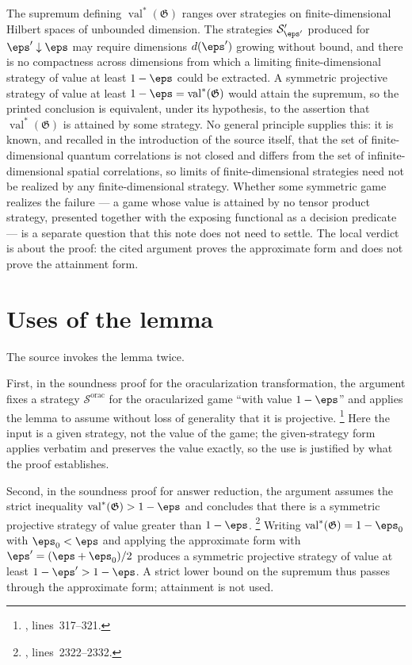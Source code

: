 \documentclass[11pt]{article}
\newcommand{\val}{\operatorname{val}}
\newcommand{\game}{\mathfrak{G}}
\newcommand{\strategy}{\mathcal{S}}
\begin{document}
The supremum defining $\val^*(\game)$ ranges over strategies on
finite-dimensional Hilbert spaces of unbounded dimension.  The strategies
$\strategy'_{\eps'}$ produced for $\eps' \downarrow \eps$ may require
dimensions $d(\eps')$ growing without bound, and there is no compactness
across dimensions from which a limiting finite-dimensional strategy of value
at least $1-\eps$ could be extracted.  A symmetric projective strategy of
value at least $1-\eps = \val^*(\game)$ would attain the supremum, so the
printed conclusion is equivalent, under its hypothesis, to the assertion that
$\val^*(\game)$ is attained by some strategy.  No general principle supplies
this: it is known, and recalled in the introduction of the source itself, that
the set of finite-dimensional quantum correlations is not closed and differs
from the set of infinite-dimensional spatial correlations, so limits of
finite-dimensional strategies need not be realized by any finite-dimensional
strategy.  Whether some symmetric game realizes the failure --- a game whose
value is attained by no tensor product strategy, presented together with the
exposing functional as a decision predicate --- is a separate question that
this note does not need to settle.  The local verdict is about the proof: the
cited argument proves the approximate form and does not prove the attainment
form.

\section{Uses of the lemma}

The source invokes the lemma twice.

First, in the soundness proof for the oracularization transformation, the
argument fixes a strategy $\strategy^{\mathrm{orac}}$ for the oracularized game
``with value $1-\eps$'' and applies the lemma to assume without loss of
generality that it is projective.%
\footnote{,
lines~317--321.}
Here the input is a given strategy, not the value of the game; the
given-strategy form applies verbatim and preserves the value exactly, so the
use is justified by what the proof establishes.

Second, in the soundness proof for answer reduction, the argument assumes the
strict inequality $\val^*(\game) > 1-\eps$ and concludes that there is a
symmetric projective strategy of value greater than $1-\eps$.%
\footnote{,
lines~2322--2332.}
Writing $\val^*(\game) = 1-\eps_0$ with $\eps_0 < \eps$ and applying the
approximate form with $\eps' = (\eps+\eps_0)/2$ produces a symmetric
projective strategy of value at least $1-\eps' > 1-\eps$.  A strict lower
bound on the supremum thus passes through the approximate form; attainment is
not used.
\end{document}
